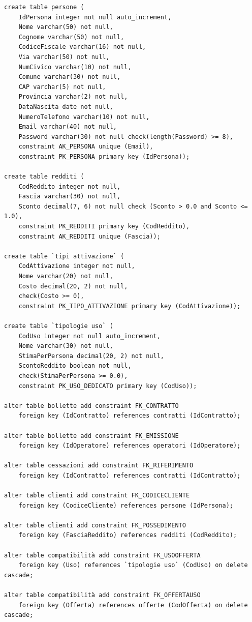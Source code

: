 \documentclass[a4paper,12pt]{report}
\begin{document}
\begin{lstlisting}
create table persone (
    IdPersona integer not null auto_increment,
    Nome varchar(50) not null,
    Cognome varchar(50) not null,
    CodiceFiscale varchar(16) not null,
    Via varchar(50) not null,
    NumCivico varchar(10) not null,
    Comune varchar(30) not null,
    CAP varchar(5) not null,
    Provincia varchar(2) not null,
    DataNascita date not null,
    NumeroTelefono varchar(10) not null,
    Email varchar(40) not null,
    Password varchar(30) not null check(length(Password) >= 8),
    constraint AK_PERSONA unique (Email),
    constraint PK_PERSONA primary key (IdPersona));
    
create table redditi (
    CodReddito integer not null,
    Fascia varchar(30) not null,
    Sconto decimal(7, 6) not null check (Sconto > 0.0 and Sconto <= 1.0),
    constraint PK_REDDITI primary key (CodReddito),
    constraint AK_REDDITI unique (Fascia));

create table `tipi attivazione` (
    CodAttivazione integer not null,
    Nome varchar(20) not null,
    Costo decimal(20, 2) not null,
    check(Costo >= 0),
    constraint PK_TIPO_ATTIVAZIONE primary key (CodAttivazione));

create table `tipologie uso` (
    CodUso integer not null auto_increment,
    Nome varchar(30) not null,
    StimaPerPersona decimal(20, 2) not null,
    ScontoReddito boolean not null,
    check(StimaPerPersona >= 0.0),
    constraint PK_USO_DEDICATO primary key (CodUso));

alter table bollette add constraint FK_CONTRATTO
    foreign key (IdContratto) references contratti (IdContratto);
     
alter table bollette add constraint FK_EMISSIONE
    foreign key (IdOperatore) references operatori (IdOperatore);
     
alter table cessazioni add constraint FK_RIFERIMENTO
    foreign key (IdContratto) references contratti (IdContratto);
     
alter table clienti add constraint FK_CODICECLIENTE
    foreign key (CodiceCliente) references persone (IdPersona);
     
alter table clienti add constraint FK_POSSEDIMENTO
    foreign key (FasciaReddito) references redditi (CodReddito);

alter table compatibilità add constraint FK_USOOFFERTA
    foreign key (Uso) references `tipologie uso` (CodUso) on delete cascade;

alter table compatibilità add constraint FK_OFFERTAUSO
    foreign key (Offerta) references offerte (CodOfferta) on delete cascade;


\end{lstlisting}
\end{document}
